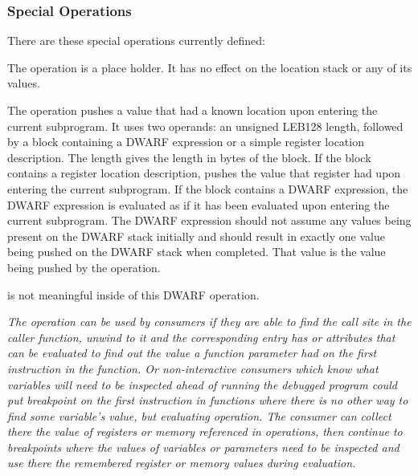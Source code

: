 \subsubsection{Special Operations}
There 
are these special operations currently defined:
\begin{enumerate}[1. ]
\itembfnl{\DWOPnopNAME}
The \DWOPnopTARG{} operation is a place holder. It has no effect
on the location stack or any of its values.

\itembfnl{\DWOPentryvalueNAME}
The \DWOPentryvalueTARG{} operation pushes a value that had a known location
upon entering the current subprogram.  It uses two operands: an 
unsigned LEB128 length, followed by 
a block containing a DWARF expression or
a simple register location description.  The length gives the length
in bytes of the block.  If the block contains a register location
description, \DWOPentryvalueNAME{} pushes the value that register had upon
entering the current subprogram.  If the block contains a DWARF expression,
the DWARF expression is evaluated as if it has been evaluated upon entering
the current subprogram.  The DWARF expression should not assume any values
being present on the DWARF stack initially and should result in exactly one
value being pushed on the DWARF stack when completed.  That value is the value
being pushed by the \DWOPentryvalueNAME{} operation.  

\DWOPpushobjectaddress{} is not meaningful inside of this DWARF operation.

\textit{The \DWOPentryvalueNAME{} operation can be used by consumers if they are able
to find the call site in the caller function, unwind to it and the corresponding
\DWTAGcallsiteparameter{} entry has \DWATcallvalue{} or
\DWATcalldatavalue{} attributes that can be evaluated to find out the
value a function parameter had on the first instruction in the function.
Or non-interactive consumers which know what variables will need to be
inspected ahead of running the debugged program could put breakpoint
on the first instruction in functions where there is no other way to find
some variable's value, but evaluating \DWOPentryvalueNAME{} operation.  The
consumer can collect there the value of registers or memory referenced in
\DWOPentryvalueNAME{} operations, then continue to breakpoints where the values
of variables or parameters need to be inspected and use there the remembered
register or memory values during \DWOPentryvalueNAME{} evaluation.
}

\end{enumerate}

